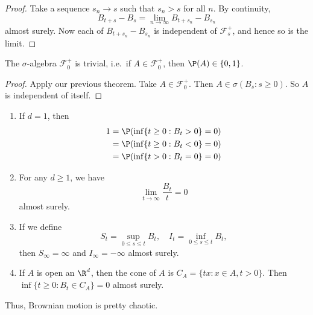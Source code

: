 \documentclass[a4paper]{article}
\begin{document}
\begin{proof}
  Take a sequence $s_n \to s$ such that $s_n > s$ for all $n$. By continuity,
  \[
    B_{t + s} - B_s = \lim_{n \to \infty} B_{t + s_n} - B_{s_n}
  \]
  almost surely. Now each of $B_{t + s_n} - B_{s_n}$ is independent of $\mathcal{F}_s^+$, and hence so is the limit.
\end{proof}

\begin{thm}
  The $\sigma$-algebra $\mathcal{F}^+_0$ is trivial, i.e.\ if $A \in \mathcal{F}_0^+$, then $\P(A) \in \{0, 1\}$.
\end{thm}

\begin{proof}
  Apply our previous theorem. Take $A \in \mathcal{F}_0^+$. Then $A \in \sigma (B_s: s \geq 0)$. So $A$ is independent of itself.
\end{proof}

\begin{prop}\leavevmode
  \begin{enumerate}
    \item If $d = 1$, then
      \begin{align*}
        1 &= \P(\inf \{t \geq 0: B_t > 0\} = 0) \\
        &= \P (\inf \{t \geq 0: B_t < 0\} = 0) \\
        &= \P(\inf \{t > 0: B_t = 0\} = 0)
      \end{align*}
    \item For any $d \geq 1$, we have
      \[
        \lim_{t \to \infty} \frac{B_t}{t} = 0
      \]
      almost surely.
    \item If we define
      \[
        S_t = \sup_{0 \leq s \leq t} B_t,\quad I_t = \inf_{0 \leq s \leq t} B_t,
      \]
      then $S_\infty = \infty$ and $I_\infty = -\infty$ almost surely.
    \item If $A$ is open an $\R^d$, then the cone of $A$ is $C_A = \{tx: x \in A, t > 0\}$. Then $\inf \{t \geq 0: B_t \in C_A\} = 0$ almost surely.
  \end{enumerate}
\end{prop}
Thus, Brownian motion is pretty chaotic.
\end{document}
